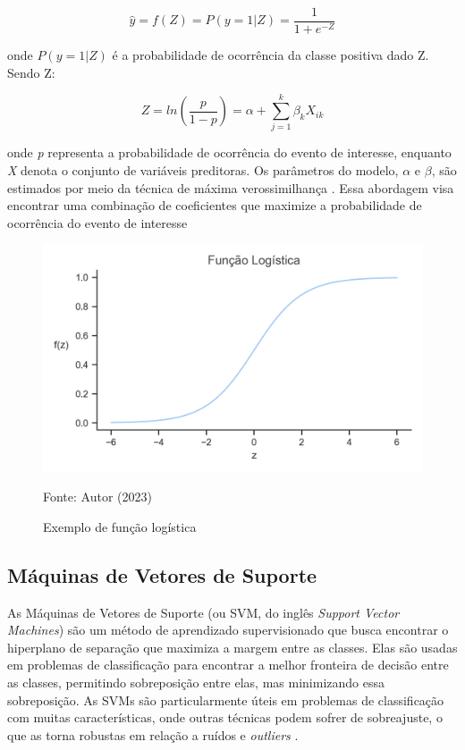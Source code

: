\begin{equation}
    \hat{y} = f(Z) = P(y = 1 | Z) = \frac{1}{1 + e^{-Z}}
\end{equation}

onde $P(y = 1 | Z)$ é a probabilidade de ocorrência da classe positiva dado Z. Sendo Z:

\begin{equation}
    Z = ln(\frac{p}{1 - p}) = \alpha + \sum_{j=1}^{k} \beta_k X_{ik}
\end{equation}

onde \textit{p} representa a probabilidade de ocorrência do evento de interesse, enquanto \textit{X} denota o conjunto de variáveis preditoras. Os parâmetros do modelo, $\alpha$ e $\beta$, são estimados por meio da técnica de máxima verossimilhança \cite{favero}. Essa abordagem visa encontrar uma combinação de coeficientes que maximize a probabilidade de ocorrência do evento de interesse

\begin{figure}[H]
    \centering
    \caption{\label{img:logreg}Exemplo de função logística}
    \includegraphics[scale=0.7]{USPSC-img/funcao-logistica.png}
    \begin{center}
        Fonte: Autor (2023)
    \end{center}
\end{figure}

\subsection{Máquinas de Vetores de Suporte}

As Máquinas de Vetores de Suporte (ou SVM, do inglês \textit{Support Vector Machines}) são um método de aprendizado supervisionado que busca encontrar o hiperplano de separação que maximiza a margem entre as classes. Elas são usadas em problemas de classificação para encontrar a melhor fronteira de decisão entre as classes, permitindo sobreposição entre elas, mas minimizando essa sobreposição. As SVMs são particularmente úteis em problemas de classificação com muitas características, onde outras técnicas podem sofrer de sobreajuste, o que as torna robustas em relação a ruídos e \textit{outliers} \cite{trevorHastie}.

